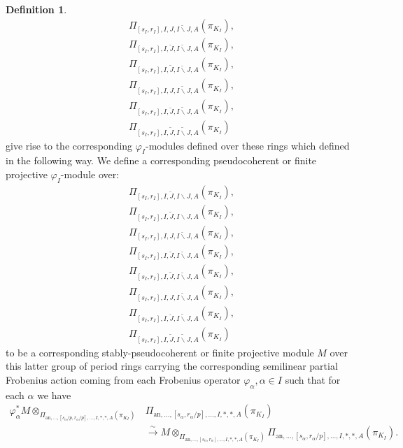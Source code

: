 \documentclass[12pt]{amsart}
\theoremstyle{definition}
\newtheorem{definition}[theorem]{Definition}
\numberwithin{equation}{section}
\begin{document}
\begin{definition}
\begin{align}
\Pi_{[s_I,r_I],I,J,\breve{I\backslash J},A}(\pi_{K_I}),\\	
\Pi_{[s_I,r_I],I,\breve{J},\breve{I\backslash J},A}(\pi_{K_I}),\\
\Pi_{[s_I,r_I],I,\widetilde{J},\breve{I\backslash J},A}(\pi_{K_I}),\\
\Pi_{[s_I,r_I],I,J,\widetilde{I\backslash J},A}(\pi_{K_I}),\\	
\Pi_{[s_I,r_I],I,\breve{J},\widetilde{I\backslash J},A}(\pi_{K_I}),\\
\Pi_{[s_I,r_I],I,\widetilde{J},\widetilde{I\backslash J},A}(\pi_{K_I})
\end{align}	
give rise to the corresponding $\varphi_I$-modules defined over these rings which defined in the following way.	
\noindent We define a corresponding pseudocoherent or finite projective $\varphi_I$-module over:
\begin{align}
\Pi_{[s_I,r_I],I,\breve{J},I\backslash J,A}(\pi_{K_I}),\\	
\Pi_{[s_I,r_I],I,\widetilde{J},I\backslash J,A}(\pi_{K_I}),\\
\Pi_{[s_I,r_I],I,J,\breve{I\backslash J},A}(\pi_{K_I}),\\	
\Pi_{[s_I,r_I],I,\breve{J},\breve{I\backslash J},A}(\pi_{K_I}),\\
\Pi_{[s_I,r_I],I,\widetilde{J},\breve{I\backslash J},A}(\pi_{K_I}),\\
\Pi_{[s_I,r_I],I,J,\widetilde{I\backslash J},A}(\pi_{K_I}),\\	
\Pi_{[s_I,r_I],I,\breve{J},\widetilde{I\backslash J},A}(\pi_{K_I}),\\
\Pi_{[s_I,r_I],I,\widetilde{J},\widetilde{I\backslash J},A}(\pi_{K_I})	
\end{align}
to be a corresponding stably-pseudocoherent or finite projective module $M$ over this latter group of period rings carrying the corresponding semilinear partial Frobenius action coming from each Frobenius operator $\varphi_\alpha,\alpha\in I$ such that for each $\alpha$ we have 
\begin{align}
\varphi_\alpha^*M\otimes_{\Pi_{\mathrm{an},...,[s_\alpha/p,r_\alpha/p],...,I,*,*,A}(\pi_{K_I})} &\Pi_{\mathrm{an},...,[s_\alpha,r_\alpha/p],...,I,*,*,A}(\pi_{K_I})\\
&\overset{\sim}{\longrightarrow} M\otimes_{\Pi_{\mathrm{an},...,[s_\alpha,r_\alpha],...,I,*,*,A}(\pi_{K_I})}\Pi_{\mathrm{an},...,[s_\alpha,r_\alpha/p],...,I,*,*,A}(\pi_{K_I}).	
\end{align}

\end{definition}
\end{document}
